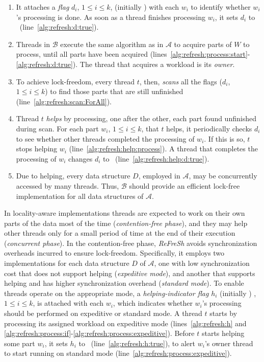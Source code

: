\newpage

\begin{enumerate}
    \item It attaches a {\em flag} $d_i$, $1 \leq i \leq k$, (initially \False)  
    with each $w_i$ to identify whether $w_i$'s processing is done.  
    As soon as a thread finishes processing $w_i$, it sets $d_i$ to \True\ (line~\ref{alg:refresh:d:true}).  

    \item Threads in $\mathcal{B}$ execute the same algorithm as in $\mathcal{A}$ to acquire parts of $W$ to process,  
    until all parts have been acquired (lines~\ref{alg:refresh:process:start}-\ref{alg:refresh:d:true}).  
    The thread that acquires a workload is its {\em owner}.  

    \item To achieve lock-freedom, every thread $t$, then, {\em scans} all the flags ($d_i$, $1 \leq i \leq k$)  
    to find those parts that are still unfinished (line~\ref{alg:refresh:scan:ForAll}).  

    \item Thread $t$ {\em helps} by processing, one after the other, each part found unfinished during scan.  
    For each part $w_i$, $1 \leq i \leq k$, that $t$ helps, it periodically checks $d_i$  
    to see whether other threads completed the processing of $w_i$. If this is so,  
    $t$ stops helping $w_i$ (line~\ref{alg:refresh:help:process}).  
    A thread that completes the processing of $w_i$ changes $d_i$ to \True\ (line~\ref{alg:refresh:help:d:true}).  

    \item Due to helping, every data structure $D$, employed in $\mathcal{A}$, may be  
    concurrently accessed by many threads. Thus, $\mathcal{B}$ should provide an efficient  
    lock-free implementation for all data structures of $\mathcal{A}$.  
\end{enumerate}


In locality-aware implementations threads are expected to work
on their own parts of the data most of the time ({\em contention-free phase}), and they
may help other threads only for a small period of time at the end of their execution
({\em concurrent phase}).
In the contention-free phase, \textit{ReFreSh} avoids synchronization overheads incurred to
ensure lock-freedom. 
Specifically, it employs two implementations for each data structure $D$ of  $\mathcal{A}$,
one with low synchronization cost that does not support helping ({\em expeditive mode}),
and another that supports helping and has higher synchronization overhead ({\em standard mode}).  
To enable threads operate on the appropriate mode,  a {\em helping-indicator flag} $h_i$ 
(initially \False) , $1 \leq i \leq k$, is attached with each $w_i$, which indicates whether 
$w_i$'s processing should be performed on expeditive or standard mode.
% 
A thread $t$ starts by processing its assigned workload 
on expeditive mode (lines~\ref{alg:refresh:h} and \ref{alg:refresh:process:if}-\ref{alg:refresh:process:expeditive}).
Before $t$ starts helping some part $w_i$, it sets $h_i$ to \True\ (line~\ref{alg:refresh:h:true}),
to alert $w_i$'s owner thread to start running on standard mode (line~\ref{alg:refresh:process:expeditive}).


